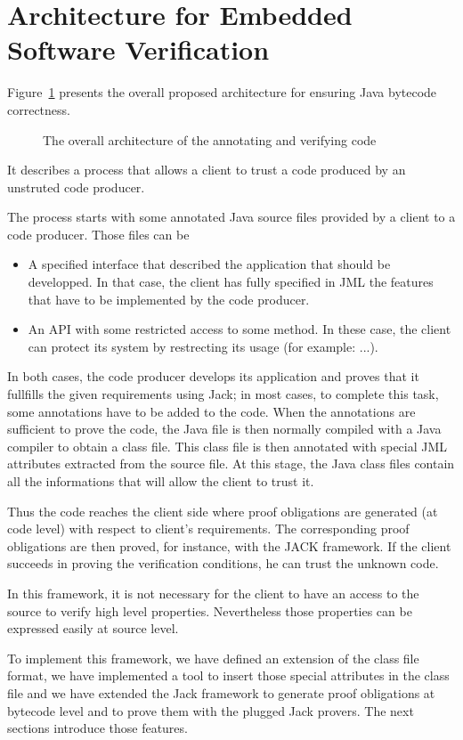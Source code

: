 \section{Architecture for Embedded Software Verification}
\label{architecture_s}	
Figure~\ref{architecture} presents the overall proposed architecture for ensuring Java bytecode correctness. 
\begin{figure}[ht!]
\begin{center}
\caption{The overall architecture of the annotating and verifying code}
\label{architecture}
\end{center}
\end{figure}
It describes a process that allows a client to trust a code produced by an unstruted code producer.

The process starts with some annotated Java source files provided by a client to a code producer. Those files can be
\begin{itemize}
\item A specified interface that described the application that should be developped. In that case, the client has fully specified in JML the features that have to be implemented by the code producer.
\item An API with some restricted access to some method. In these case, the client can protect its system by restrecting its usage (for example: ...). 
\end{itemize}
In both cases, the code producer develops its application and proves that it fullfills the given requirements using Jack; 
in most cases, to complete this task, some annotations have to be added to the code.
When the annotations are sufficient to prove the code, the Java file is then normally compiled with a Java compiler to obtain a 
class file. 
This class file is then annotated with special JML attributes extracted from the source file. 
At this stage, the Java class files contain all the informations that will allow the client to trust it.

Thus the code reaches the client side where proof obligations are generated (at code level) with respect to client's requirements. 
The corresponding proof obligations are then proved, for instance, with the JACK framework. If the client succeeds in proving 
the verification conditions, he can trust the unknown code. 

In this framework, it is not necessary for the client to have an access to the source to verify high level properties. 
Nevertheless those properties can be expressed easily at source level.

To implement this framework, we have defined an extension of the class file format, we have implemented a tool to insert 
those special attributes in the class file and we have extended the Jack framework to generate proof obligations at bytecode level and to prove them with the plugged Jack provers. The next sections introduce those features.  

